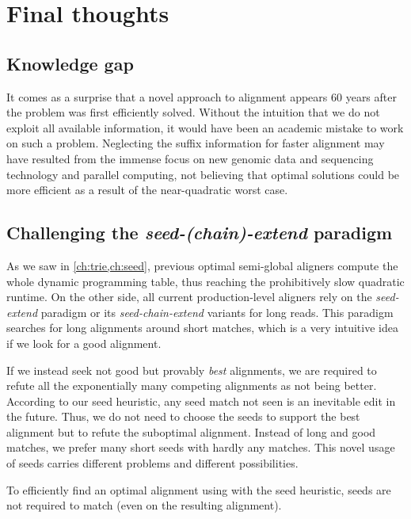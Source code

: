 \section*{Final thoughts}

\subsection*{Knowledge gap}

It comes as a surprise that a novel approach to alignment appears 60 years after
the problem was first efficiently solved. Without the intuition that we do not
exploit all available information, it would have been an academic mistake to
work on such a problem. Neglecting the suffix information for faster alignment
may have resulted from the immense focus on new genomic data and sequencing
technology and parallel computing, not believing that optimal solutions could be
more efficient as a result of the near-quadratic worst case.

\subsection*{Challenging the \emph{seed-(chain)-extend} paradigm}

As we saw in \cref{ch:trie,ch:seed}, previous optimal semi-global aligners
compute the whole dynamic programming table, thus reaching the prohibitively
slow quadratic runtime. On the other side, all current production-level aligners
rely on the \emph{seed-extend} paradigm or its \emph{seed-chain-extend} variants
for long reads. This paradigm searches for long alignments around short matches,
which is a very intuitive idea if we look for a good alignment.

If we instead seek not good but provably \emph{best} alignments, we are required
to refute all the exponentially many competing alignments as not being better.
According to our seed heuristic, any seed match not seen is an inevitable edit
in the future. Thus, we do not need to choose the seeds to support the best
alignment but to refute the suboptimal alignment. Instead of long and good
matches, we prefer many short seeds with hardly any matches. This novel usage of
seeds carries different problems and different possibilities.

\begin{observation}
    To efficiently find an optimal alignment using \A with the seed heuristic,
    seeds are not required to match (even on the resulting alignment).
\end{observation}

